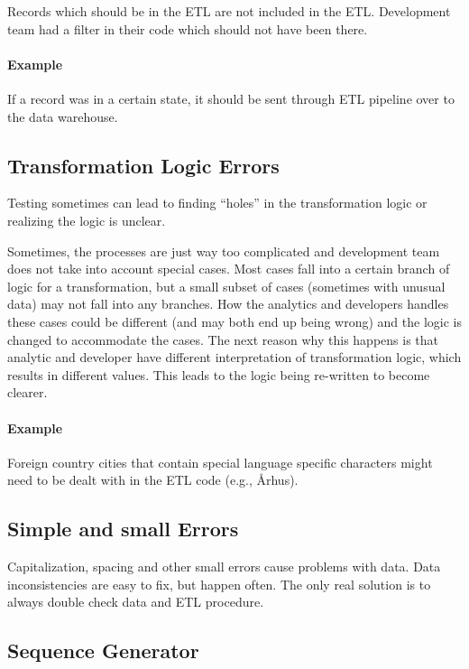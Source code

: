 Records which should be in the ETL are not included in the ETL.
Development team had a filter in their code which should not have been there.

\paragraph*{Example} If a record was in a certain state, it should be sent through ETL pipeline over to the data warehouse.

\subsection*{Transformation Logic Errors}

Testing sometimes can lead to finding \enquote{holes} in the transformation logic or realizing the logic is unclear.

Sometimes, the processes are just way too complicated and development team does not take into account special cases.
Most cases fall into a certain branch of logic for a transformation, but a small subset of cases (sometimes with unusual data) may not fall into any branches.
How the analytics and developers handles these cases could be different (and may both end up being wrong) and the logic is changed to accommodate the cases.
The next reason why this happens is that analytic and developer have different interpretation of transformation logic, which results in different values.
This leads to the logic being re-written to become clearer.

\paragraph*{Example} Foreign country cities that contain special language specific characters might need to be dealt with in the ETL code (e.g., Århus).

\subsection*{Simple and small Errors}

Capitalization, spacing and other small errors cause problems with data.
Data inconsistencies are easy to fix, but happen often.
The only real solution is to always double check data and ETL procedure.

\subsection*{Sequence Generator}

